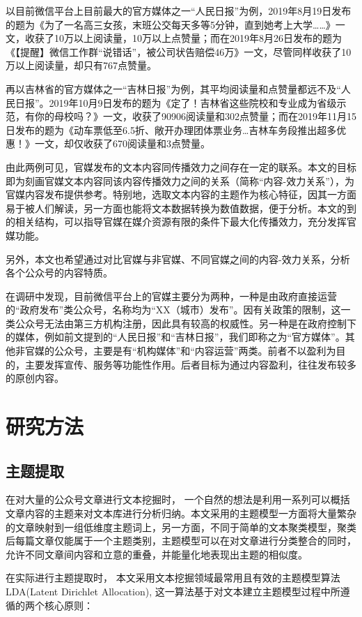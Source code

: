 \documentclass[a4paper,12pt]{article}
\begin{document}
    以目前微信平台上目前最大的官方媒体之一“人民日报”为例，2019年8月19日发布的题为《为了一名高三女孩，末班公交每天多等5分钟，直到她考上大学……》一文，收获了10万以上阅读量，10万以上点赞量；而在2019年8月26日发布的题为《【提醒】微信工作群“说错话”，被公司状告赔偿46万》一文，尽管同样收获了10万以上阅读量，却只有767点赞量。
    
    再以吉林省的官方媒体之一“吉林日报”为例，其平均阅读量和点赞量都远不及“人民日报”。2019年10月9日发布的题为《定了！吉林省这些院校和专业成为省级示范，有你的母校吗？》一文，收获了90906阅读量和302点赞量；而在2019年11月15日发布的题为《动车票低至6.5折、敞开办理团体票业务…吉林车务段推出超多优惠！》一文，却仅收获了670阅读量和3点赞量。
    
    由此两例可见，官媒发布的文本内容同传播效力之间存在一定的联系。本文的目标即为刻画官媒文本内容同该内容传播效力之间的关系（简称“内容-效力关系”），为官媒内容发布提供参考。特别地，选取文本内容的主题作为核心特征，因其一方面易于被人们解读，另一方面也能将文本数据转换为数值数据，便于分析。本文的到的相关结构，可以指导官媒在媒介资源有限的条件下最大化传播效力，充分发挥官媒功能。

    另外，本文也希望通过对比官媒与非官媒、不同官媒之间的内容-效力关系，分析各个公众号的内容特质。

    在调研中发现，目前微信平台上的官媒主要分为两种，一种是由政府直接运营的“政府发布”类公众号，名称均为“XX（城市）发布”。因有关政策的限制，这一类公众号无法由第三方机构注册，因此具有较高的权威性。另一种是在政府控制下的媒体，例如前文提到的“人民日报”和“吉林日报”，我们即称之为“官方媒体”。其他非官媒的公众号，主要是有“机构媒体”和“内容运营”两类。前者不以盈利为目的，主要发挥宣传、服务等功能性作用。后者目标为通过内容盈利，往往发布较多的原创内容。
    \section{研究方法}
    \subsection{主题提取}
    在对大量的公众号文章进行文本挖掘时， 一个自然的想法是利用一系列可以概括文章内容的主题来对文本库进行分析归纳。本文采用的主题模型一方面将大量繁杂的文章映射到一组低维度主题词上，另一方面，不同于简单的文本聚类模型，聚类后每篇文章仅能属于一个主题类别，主题模型可以在对文章进行分类整合的同时，允许不同文章间内容和立意的重叠，并能量化地表现出主题的相似度。

    在实际进行主题提取时， 本文采用文本挖掘领域最常用且有效的主题模型算法LDA(Latent Dirichlet Allocation), 这一算法基于对文本建立主题模型过程中所遵循的两个核心原则：
    
\end{document}
